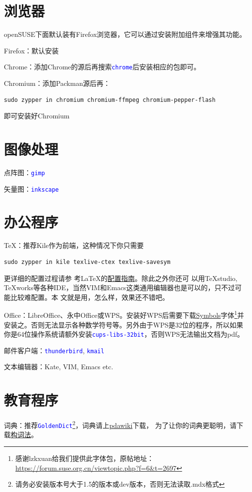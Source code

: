 \documentclass[12pt,openany]{book}
\newcommand{\soft}[1]{\texttt{\textcolor{blue}{#1}}}
\begin{document}
\section{浏览器}
openSUSE下面默认装有Firefox浏览器，它可以通过安装附加组件来增强其功能。

Firefox：默认安装

Chrome：添加Chrome的源后再搜索\soft{chrome}后安装相应的包即可。

Chromium：添加Packman源后再：
\begin{Verbatim}[formatcom=\color{codecolor}]
    sudo zypper in chromium chromium-ffmpeg chromium-pepper-flash
\end{Verbatim}
即可安装好Chromium
\section{图像处理}
点阵图：\soft{gimp}

矢量图：\soft{inkscape}
\section{办公程序}
\TeX ：推荐Kile作为前端，这种情况下你只需要
\begin{Verbatim}[formatcom=\color{codecolor}]
    sudo zypper in kile texlive-ctex texlive-savesym
\end{Verbatim}
更详细的配置过程请参
考\LaTeX 的\href{https://forum.suse.org.cn/viewtopic.php?f=6&t=2392&p=18750}{配置指南}。除此之外你还可
以用\TeX studio, \TeX works等各种IDE，当然VIM和Emacs这类通用编辑器也是可以的，只不过可能比较难配置。本
文就是用，怎么样，效果还不错吧。

Office：LibreOffice、永中Office或WPS。安装好WPS后需要下载\href{http://pan.baidu.com/s/1mgC3A0C}{Symbols}字体\footnote{感谢lzkxuan给我们提供此字体包，原帖地址：\url{https://forum.suse.org.cn/viewtopic.php?f=6&t=2697}}并安装之。否则无法显示各种数学符号等。另外由于WPS是32位的程序，所以如果你是64位操作系统请额外安装\soft{cups-libs-32bit}，否则WPS无法输出文档为pdf。

邮件客户端：\soft{thunderbird}, \soft{kmail}

文本编辑器：Kate, VIM, Emacs etc.
\section{教育程序}
词典：推荐\soft{GoldenDict}\footnote{请务必安装版本号大于1.5的版本或dev版本，否则无法读取.mdx格式}，词典请上\href{http://pdawiki.com/forum/forum.php}{pdawiki}下载，
为了让你的词典更聪明，请下载\href{https://zpj.blog.ustc.edu.cn/wp-content/uploads/2014/02/wordsrule.tar.gz}{构词法}。
\end{document}
